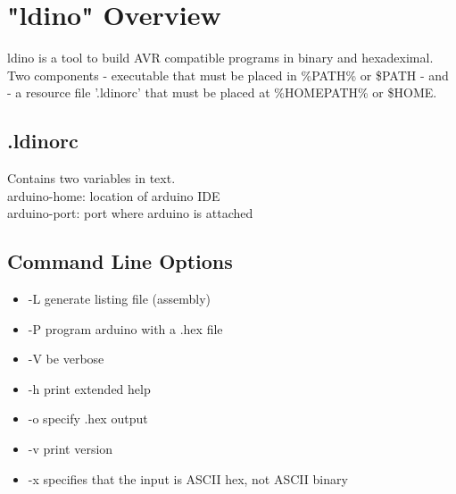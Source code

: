 \documentclass{article}
\begin{document}
\section{"ldino" Overview}
ldino is a tool to build AVR compatible programs in binary and hexadeximal.
Two components - executable that must be placed in \%PATH\% or \$PATH - and - a resource file '.ldinorc' that must be placed at \%HOMEPATH\% or \$HOME.

\subsection{.ldinorc}
Contains two variables in text.\\
arduino-home: location of arduino IDE\\
arduino-port: port where arduino is attached\\

\subsection{Command Line Options}
\begin{itemize}
  \item -L generate listing file (assembly)
  \item -P program arduino with a .hex file
  \item -V be verbose
  \item -h print extended help
  \item -o specify .hex output
  \item -v print version
  \item -x specifies that the input is ASCII hex, not ASCII binary
\end{itemize}
\end{document}

